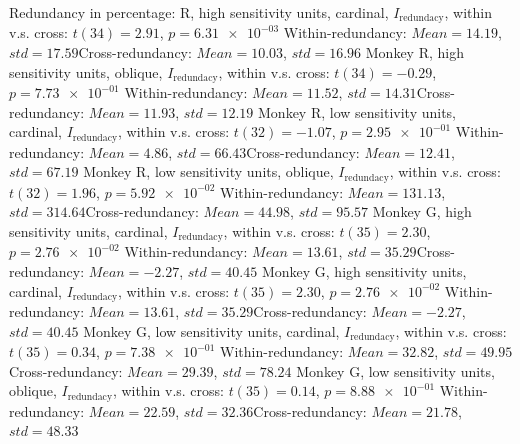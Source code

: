 Redundancy in percentage: \nMonkey R, high sensitivity units, cardinal, $I_\textrm{redundacy}$, within v.s. cross: $t(34) = 2.91$, $p = \num{6.31e-03}$ 
Within-redundancy: $Mean = 14.19$, $std = 17.59$Cross-redundancy: $Mean = 10.03$, $std = 16.96$ 
Monkey R, high sensitivity units, oblique,  $I_\textrm{redundacy}$, within v.s. cross: $t(34) = -0.29$, $p = \num{7.73e-01}$ 
Within-redundancy: $Mean = 11.52$, $std = 14.31$Cross-redundancy: $Mean = 11.93$, $std = 12.19$ 
Monkey R, low sensitivity units, cardinal, $I_\textrm{redundacy}$, within v.s. cross: $t(32) = -1.07$, $p = \num{2.95e-01}$ 
Within-redundancy: $Mean = 4.86$, $std = 66.43$Cross-redundancy: $Mean = 12.41$, $std = 67.19$ 
Monkey R, low sensitivity units, oblique,  $I_\textrm{redundacy}$, within v.s. cross: $t(32) = 1.96$, $p = \num{5.92e-02}$ 
Within-redundancy: $Mean = 131.13$, $std = 314.64$Cross-redundancy: $Mean = 44.98$, $std = 95.57$ 
Monkey G, high sensitivity units, cardinal, $I_\textrm{redundacy}$, within v.s. cross: $t(35) = 2.30$, $p = \num{2.76e-02}$ 
Within-redundancy: $Mean = 13.61$, $std = 35.29$Cross-redundancy: $Mean = -2.27$, $std = 40.45$ 
Monkey G, high sensitivity units, cardinal, $I_\textrm{redundacy}$, within v.s. cross: $t(35) = 2.30$, $p = \num{2.76e-02}$ 
Within-redundancy: $Mean = 13.61$, $std = 35.29$Cross-redundancy: $Mean = -2.27$, $std = 40.45$ 
Monkey G, low sensitivity units, cardinal, $I_\textrm{redundacy}$, within v.s. cross: $t(35) = 0.34$, $p = \num{7.38e-01}$ 
Within-redundancy: $Mean = 32.82$, $std = 49.95$Cross-redundancy: $Mean = 29.39$, $std = 78.24$ 
Monkey G, low sensitivity units, oblique,  $I_\textrm{redundacy}$, within v.s. cross: $t(35) = 0.14$, $p = \num{8.88e-01}$ 
Within-redundancy: $Mean = 22.59$, $std = 32.36$Cross-redundancy: $Mean = 21.78$, $std = 48.33$ 
